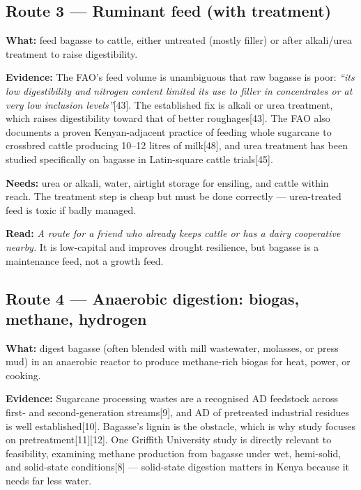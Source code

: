 \documentclass[11pt]{article}
\newcommand{\src}[1]{[#1]}
\begin{document}
\subsection{Route 3 --- Ruminant feed (with treatment)}

\textbf{What:} feed bagasse to cattle, either untreated (mostly filler) or
after alkali/urea treatment to raise digestibility.

\textbf{Evidence:} The FAO's feed volume is unambiguous that raw bagasse is
poor: \emph{``its low digestibility and nitrogen content limited its use to
filler in concentrates or at very low inclusion levels''}\src{43}. The
established fix is alkali or urea treatment, which raises digestibility toward
that of better roughages\src{43}. The FAO also documents a proven Kenyan-adjacent
practice of feeding whole sugarcane to crossbred cattle producing 10--12 litres
of milk\src{48}, and urea treatment has been studied specifically on bagasse in
Latin-square cattle trials\src{45}.

\textbf{Needs:} urea or alkali, water, airtight storage for ensiling, and
cattle within reach. The treatment step is cheap but must be done correctly ---
urea-treated feed is toxic if badly managed.

\textbf{Read:} \emph{A route for a friend who already keeps cattle or has a
dairy cooperative nearby.} It is low-capital and improves drought resilience,
but bagasse is a maintenance feed, not a growth feed.

\subsection{Route 4 --- Anaerobic digestion: biogas, methane, hydrogen}

\textbf{What:} digest bagasse (often blended with mill wastewater, molasses,
or press mud) in an anaerobic reactor to produce methane-rich biogas for heat,
power, or cooking.

\textbf{Evidence:} Sugarcane processing wastes are a recognised AD feedstock
across first- and second-generation streams\src{9}, and AD of pretreated
industrial residues is well established\src{10}. Bagasse's lignin is the
obstacle, which is why study focuses on pretreatment\src{11}\src{12}. One
Griffith University study is directly relevant to feasibility, examining
methane production from bagasse under wet, hemi-solid, and solid-state
conditions\src{8} --- solid-state digestion matters in Kenya because it needs
far less water.
\end{document}
